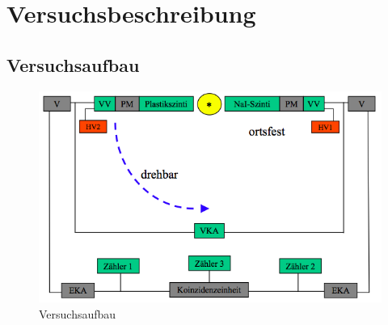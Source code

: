 \section{Versuchsbeschreibung}

\subsection{Versuchsaufbau}

\begin{figure}[H]
\centering \includegraphics[width = \textwidth]{Bilder/Aufbau.png}
\caption{Versuchsaufbau}
\end{figure}